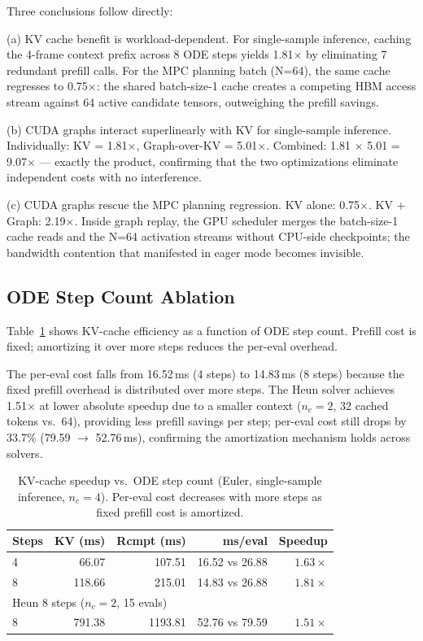 \documentclass[letterpaper,twocolumn,10pt]{article}
\begin{document}
Three conclusions follow directly:

(a) KV cache benefit is workload-dependent. For
single-sample inference, caching the 4-frame context prefix across
8 ODE steps yields 1.81$\times$ by eliminating 7 redundant prefill
calls.  For the MPC planning batch (N=64), the same cache
regresses to 0.75$\times$: the shared batch-size-1 cache
creates a competing HBM access stream against 64 active candidate
tensors, outweighing the prefill savings.

(b) CUDA graphs interact superlinearly with KV for
single-sample inference.
Individually: KV = 1.81$\times$, Graph-over-KV = 5.01$\times$.
Combined: 1.81 $\times$ 5.01 = 9.07$\times$ --- exactly the product,
confirming that the two optimizations eliminate independent costs
with no interference.

(c) CUDA graphs rescue the MPC planning regression.
KV alone: 0.75$\times$.  KV + Graph: 2.19$\times$.  Inside graph
replay, the GPU scheduler merges the batch-size-1 cache reads and
the N=64 activation streams without CPU-side checkpoints; the
bandwidth contention that manifested in eager mode becomes invisible.

\subsection{ODE Step Count Ablation}

Table~\ref{tab:steps} shows KV-cache efficiency as a function of ODE
step count.  Prefill cost is fixed; amortizing it over more steps
reduces the per-eval overhead.

The per-eval cost falls from 16.52\,ms (4 steps) to 14.83\,ms
(8 steps) because the fixed prefill overhead is distributed over
more steps.  The Heun solver achieves 1.51$\times$ at lower absolute
speedup due to a smaller context ($n_c{=}2$, 32 cached tokens vs.\
64), providing less prefill savings per step; per-eval cost still
drops by 33.7\% (79.59 $\to$ 52.76\,ms), confirming the amortization
mechanism holds across solvers.

\begin{table}[H]
\centering
\caption{KV-cache speedup vs.\ ODE step count (Euler, single-sample
  inference, $n_c{=}4$).  Per-eval cost decreases with more steps as
  fixed prefill cost is amortized.}
\label{tab:steps}
\begin{tabular}{@{}lrrrr@{}}
\toprule
\textbf{Steps} & \textbf{KV (ms)} & \textbf{Rcmpt (ms)} &
                \textbf{ms/eval} & \textbf{Speedup} \\
\midrule
4  &  66.07 & 107.51 & 16.52 vs 26.88 & $1.63\times$ \\
8  & 118.66 & 215.01 & 14.83 vs 26.88 & $1.81\times$ \\
\midrule
\multicolumn{4}{l}{\small Heun 8 steps ($n_c{=}2$, 15 evals)} \\
8  & 791.38 & 1193.81 & 52.76 vs 79.59 & $1.51\times$ \\
\bottomrule
\end{tabular}
\end{table}
\end{document}
